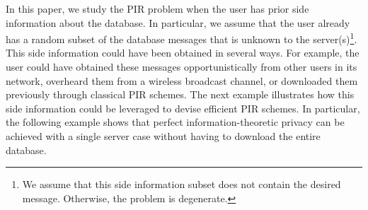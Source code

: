 \documentclass[letterpaper, 10 pt, conference]{ieeeconf}
\begin{document}
In this paper, we study the  PIR problem when  the user has  prior side information about the database. In particular, we assume that the user already has a random subset of the database messages that is unknown to the server(s)\footnote{We assume that this side information subset does not contain the desired message. Otherwise, the problem is degenerate.}. This  side information could have been obtained in several ways. For example, the user could have obtained  these messages opportunistically from other users in its network,  overheard them from a wireless broadcast channel, or downloaded them previously through classical PIR schemes. The next example illustrates how this side information could be leveraged to devise efficient  PIR schemes. In particular, 
the following example shows that perfect information-theoretic privacy can be achieved with  a single server case without having to download the entire database.
\end{document}
